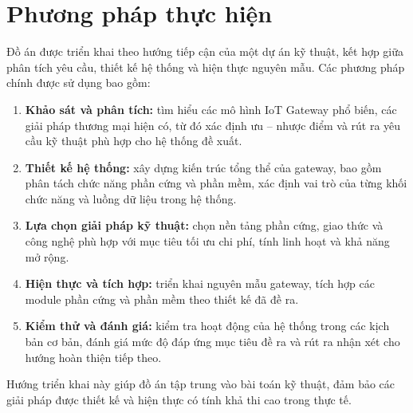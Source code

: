     \section{Phương pháp thực hiện}
        Đồ án được triển khai theo hướng tiếp cận của một dự án kỹ thuật, kết hợp giữa phân tích yêu cầu, thiết kế hệ thống và hiện thực nguyên mẫu. Các phương pháp chính được sử dụng bao gồm:
        \begin{enumerate}
            \item \textbf{Khảo sát và phân tích:} tìm hiểu các mô hình IoT Gateway phổ biến, các giải pháp thương mại hiện có, từ đó xác định ưu – nhược điểm và rút ra yêu cầu kỹ thuật phù hợp cho hệ thống đề xuất.
            \item \textbf{Thiết kế hệ thống:} xây dựng kiến trúc tổng thể của gateway, bao gồm phân tách chức năng phần cứng và phần mềm, xác định vai trò của từng khối chức năng và luồng dữ liệu trong hệ thống.
            \item \textbf{Lựa chọn giải pháp kỹ thuật:} chọn nền tảng phần cứng, giao thức và công nghệ phù hợp với mục tiêu tối ưu chi phí, tính linh hoạt và khả năng mở rộng.
            \item \textbf{Hiện thực và tích hợp:} triển khai nguyên mẫu gateway, tích hợp các module phần cứng và phần mềm theo thiết kế đã đề ra.
            \item \textbf{Kiểm thử và đánh giá:} kiểm tra hoạt động của hệ thống trong các kịch bản cơ bản, đánh giá mức độ đáp ứng mục tiêu đề ra và rút ra nhận xét cho hướng hoàn thiện tiếp theo.
        \end{enumerate}
        Hướng triển khai này giúp đồ án tập trung vào bài toán kỹ thuật, đảm bảo các giải pháp được thiết kế và hiện thực có tính khả thi cao trong thực tế.